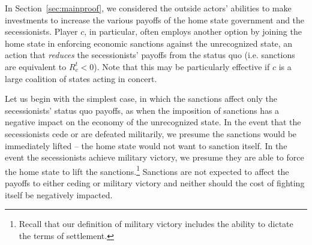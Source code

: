 \documentclass[11pt,letterpaper, notitlepage]{article}
\begin{document}



In Section~\ref{sec:mainproof}, we considered the outside actors' abilities to make investments to increase the various payoffs of the home state government and the secessionists. Player $c$, in particular, often employs another option by joining the home state in enforcing economic sanctions against the unrecognized state, an action that \emph{reduces} the secessionists' payoffs from the status quo (i.e. sanctions are equivalent to $R_c^t < 0$). Note that this may be particularly effective if $c$ is a large coalition of states acting in concert. 

Let us begin with the simplest case, in which the sanctions affect only the secessionists' status quo payoffs, as when the imposition of sanctions has a negative impact on the economy of the unrecognized state. In the event that the secessionists cede or are defeated militarily, we presume the sanctions would be immediately lifted -- the home state would not want to sanction itself. In the event the secessionists achieve military victory, we presume they are able to force the home state to lift the sanctions.\footnote{Recall that our definition of military victory includes the ability to dictate the terms of settlement.} Sanctions are not expected to affect the payoffs to either ceding or military victory and neither should the cost of fighting itself be negatively impacted.
\end{document}
